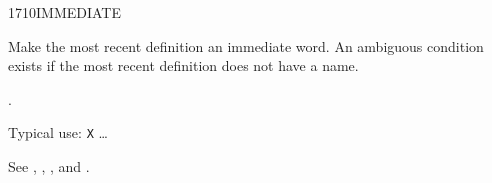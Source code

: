 \begin{worddef}{1710}{IMMEDIATE}
\item \stack{}{}

	Make the most recent definition an immediate word. An ambiguous
	condition exists if the most recent definition does not have a
	name.

\see {}.

	\begin{defer}
	\rationale %
		Typical use:
			\word{:} \texttt{X}
			{\ldots} \word{;} 

	\testing*
		See ,
			,
			, and
			.
	\end{defer}
\end{worddef}


